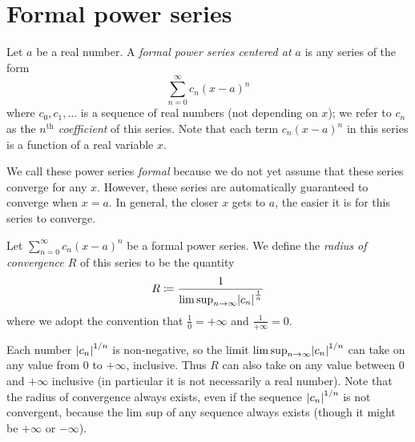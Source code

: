 \section{Formal power series}\label{sec 4.1}

\begin{definition}\label{4.1.1}
    Let \(a\) be a real number.
    A \emph{formal power series centered at \(a\)} is any series of the form
    \[
        \sum_{n = 0}^\infty c_n (x - a)^n
    \]
    where \(c_0, c_1, \dots\) is a sequence of real numbers (not depending on \(x\));
    we refer to \(c_n\) as the \emph{\(n^{\text{th}}\) coefficient} of this series.
    Note that each term \(c_n (x - a)^n\) in this series is a function of a real variable \(x\).
\end{definition}

\begin{note}
    We call these power series \emph{formal} because we do not yet assume that these series converge for any \(x\).
    However, these series are automatically guaranteed to converge when \(x = a\).
    In general, the closer \(x\) gets to \(a\), the easier it is for this series to converge.
\end{note}

\setcounter{theorem}{2}
\begin{definition}\label{4.1.3}
    Let \(\sum_{n = 0}^\infty c_n (x - a)^n\) be a formal power series.
    We define the \emph{radius of convergence \(R\)} of this series to be the quantity
    \[
        R \coloneqq \frac{1}{\limsup_{n \to \infty} \abs{c_n}^{\frac{1}{n}}}
    \]
    where we adopt the convention that \(\frac{1}{0} = +\infty\) and \(\frac{1}{+\infty} = 0\).
\end{definition}

\begin{remark}\label{4.1.4}
    Each number \(\left\lvert c_n\right\rvert^{1 / n}\) is non-negative, so the limit \(\limsup_{n \to \infty} \abs{c_n}^{1 / n}\) can take on any value from \(0\) to \(+\infty\), inclusive.
    Thus \(R\) can also take on any value between \(0\) and \(+\infty\) inclusive
    (in particular it is not necessarily a real number).
    Note that the radius of convergence always exists, even if the sequence \(\left\lvert c_n\right\rvert^{1 / n}\) is not convergent, because the lim sup of any sequence always exists
    (though it might be \(+\infty\) or \(-\infty\)).
\end{remark}

